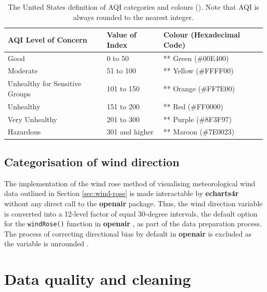 \documentclass{aucklandthesis}
\begin{document}
\begin{table}[ht]
\begin{center}
\begin{tabular}{lll}
\toprule
AQI Level of Concern & Value of Index & Colour (Hexadecimal Code) \\
\midrule
Good & 0 to 50 & \colorbox[rgb]{0,.89,0}{\textcolor[rgb]{0,.89,0}{**}} Green (\#00E400) \\
Moderate & 51 to 100 & \colorbox[rgb]{1,1,0}{\textcolor[rgb]{1,1,0}{**}} Yellow (\#FFFF00) \\
Unhealthy for Sensitive Groups & 101 to 150 & \colorbox[rgb]{1,.49,0}{\textcolor[rgb]{1,.49,0}{**}} Orange (\#FF7E00) \\
Unhealthy & 151 to 200 & \colorbox[rgb]{1,0,0}{\textcolor[rgb]{1,0,0}{**}} Red (\#FF0000) \\
Very Unhealthy & 201 to 300 & \colorbox[rgb]{.56,.25,.59}{\textcolor[rgb]{.56,.25,.59}{**}} Purple (\#8F3F97) \\
Hazardous & 301 and higher & \colorbox[rgb]{.49,0,.14}{\textcolor[rgb]{.49,0,.14}{**}} Maroon (\#7E0023) \\
\bottomrule
\end{tabular}
\caption{The United States definition of AQI categories and colours (\cite{usaqrs}). Note that AQI is always rounded to the nearest integer.}
\end{center}
\end{table}

\hypertarget{categorisation-of-wind-direction}{%
\subsection{Categorisation of wind direction}\label{categorisation-of-wind-direction}}

The implementation of the wind rose method of visualising meteorological wind data outlined in Section \ref{sec:wind-rose} is made interactable by \textbf{echarts4r} \autocite{echarts4r} without any direct call to the \textbf{openair} package. Thus, the wind direction variable is converted into a 12-level factor of equal 30-degree intervals, the default option for the \texttt{windRose()} function in \textbf{openair} \autocite{openair}, as part of the data preparation process. The process of correcting directional bias by default in \textbf{openair} is excluded as the variable is unrounded \autocite{cdbias}.

\hypertarget{data-quality-and-cleaning}{%
\section{Data quality and cleaning}\label{data-quality-and-cleaning}}
\end{document}
